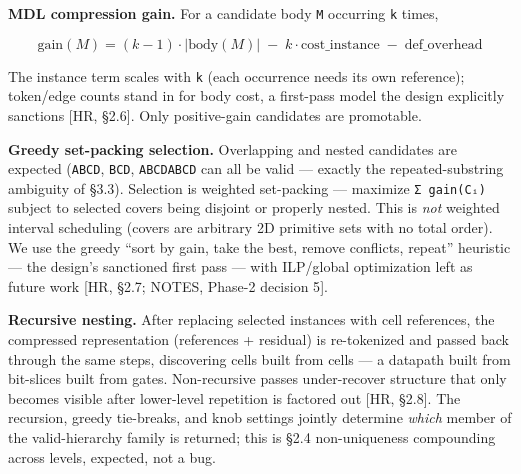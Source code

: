 \documentclass[
  11pt,
]{article}
\begin{document}
\textbf{MDL compression gain.} For a candidate body \texttt{M} occurring
\texttt{k} times,

\[\mathrm{gain}(M) = (k-1)\cdot|\mathrm{body}(M)| \;-\; k\cdot\mathrm{cost\_instance} \;-\; \mathrm{def\_overhead}\]

The instance term scales with \texttt{k} (each occurrence needs its own
reference); token/edge counts stand in for body cost, a first-pass model
the design explicitly sanctions {[}HR, §2.6{]}. Only positive-gain
candidates are promotable.

\textbf{Greedy set-packing selection.} Overlapping and nested candidates
are expected (\texttt{ABCD}, \texttt{BCD}, \texttt{ABCDABCD} can all be
valid --- exactly the repeated-substring ambiguity of §3.3). Selection
is weighted set-packing --- maximize \texttt{Σ\ gain(Cᵢ)} subject to
selected covers being disjoint or properly nested. This is \emph{not}
weighted interval scheduling (covers are arbitrary 2D primitive sets
with no total order). We use the greedy ``sort by gain, take the best,
remove conflicts, repeat'' heuristic --- the design's sanctioned first
pass --- with ILP/global optimization left as future work {[}HR, §2.7;
NOTES, Phase-2 decision 5{]}.

\textbf{Recursive nesting.} After replacing selected instances with cell
references, the compressed representation (references + residual) is
re-tokenized and passed back through the same steps, discovering cells
built from cells --- a datapath built from bit-slices built from gates.
Non-recursive passes under-recover structure that only becomes visible
after lower-level repetition is factored out {[}HR, §2.8{]}. The
recursion, greedy tie-breaks, and knob settings jointly determine
\emph{which} member of the valid-hierarchy family is returned; this is
§2.4 non-uniqueness compounding across levels, expected, not a bug.
\end{document}
